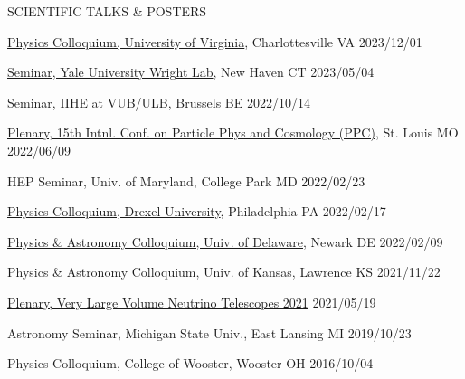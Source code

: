 \documentclass{resume} %
\begin{document}
\begin{rSection}{SCIENTIFIC TALKS \& POSTERS}
\begin{etaremune}
\item \href{https://www.phys.virginia.edu/Announcements/talk-list.asp?PERIOD=SID:4440}{Physics Colloquium, University of Virginia}, Charlottesville VA  \hfill 2023/12/01

\item \href{https://physics.yale.edu/event/npa-seminar-brian-clark-umd-college-park-chasing-ghost-particle-neutrino-astrophysics-south}{Seminar, Yale University Wright Lab}, New Haven CT  \hfill 2023/05/04

\item \href{https://indico.iihe.ac.be/event/1620/}{Seminar, IIHE at VUB/ULB}, Brussels BE  \hfill 2022/10/14

\item \href{https://indico.cern.ch/event/1126527/contributions/4818939/}{Plenary, 15th Intnl. Conf. on Particle Phys and Cosmology (PPC)}, St. Louis MO  \hfill 2022/06/09

\item HEP Seminar, Univ. of Maryland, College Park MD \hfill 2022/02/23

\item \href{https://drexel.edu/coas/news-events/events-calendar/details/?eid=35304&iid=93965}{Physics Colloquium, Drexel University}, Philadelphia PA  \hfill 2022/02/17

\item \href{https://web.physics.udel.edu/events/colloquium/colloquium-brian-clark}{Physics \& Astronomy Colloquium, Univ. of Delaware}, Newark DE \hfill 2022/02/09

\item Physics \& Astronomy Colloquium, Univ. of Kansas, Lawrence KS \hfill 2021/11/22

\item \href{https://indico.ific.uv.es/event/3965/contributions/14963/}{Plenary, Very Large Volume Neutrino Telescopes 2021} \hfill 2021/05/19

\item Astronomy Seminar, Michigan State Univ., East Lansing MI \hfill 2019/10/23

\item Physics Colloquium, College of Wooster, Wooster OH \hfill 2016/10/04

\end{etaremune}


\end{rSection}
\end{document}
